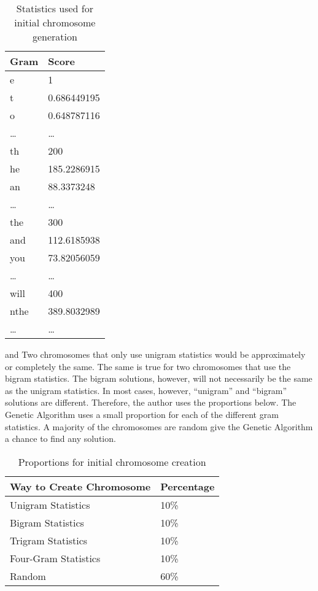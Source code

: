 \begin{table}[H]
    \centering

    \begin{tabular}{|l|l|}
    \hline
    Gram & Score       \\ \hline
    e    & 1           \\ \hline
    t    & 0.686449195 \\ \hline
    o    & 0.648787116 \\ \hline
    …    & …           \\ \hline
    th   & 200         \\ \hline
    he   & 185.2286915 \\ \hline
    an   & 88.3373248  \\ \hline
    …    & …           \\ \hline
    the  & 300         \\ \hline
    and  & 112.6185938 \\ \hline
    you  & 73.82056059 \\ \hline
    …    & …           \\ \hline
    will & 400         \\ \hline
    nthe & 389.8032989 \\ \hline
    …    & …           \\ \hline
    \end{tabular}
    \caption{Statistics used for initial chromosome generation}
    \end{table}
and Two chromosomes that only use unigram statistics would be approximately or completely the same. The same is true for
two chromosomes that use the bigram statistics. The bigram
solutions, however, will not necessarily be the same as the
unigram statistics. In most cases, however, “unigram” and
“bigram” solutions are different. Therefore, the author uses
the proportions below. The Genetic Algorithm uses a small
proportion for each of the different gram statistics. A majority
of the chromosomes are random give the Genetic Algorithm a
chance to find any solution.
\begin{table}[H]
    \centering
    \begin{tabular}{|l|l|}
    \hline
    Way to Create Chromosome & Percentage \\ \hline
    Unigram Statistics       & 10\%       \\ \hline
    Bigram Statistics        & 10\%       \\ \hline
    Trigram Statistics       & 10\%       \\ \hline
    Four-Gram Statistics     & 10\%       \\ \hline
    Random                   & 60\%       \\ \hline
    \end{tabular}
    \caption{Proportions for initial chromosome creation}
    \end{table}
